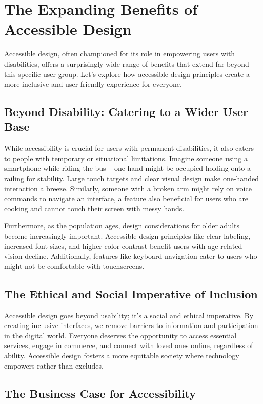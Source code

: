 \section{The Expanding Benefits of Accessible Design}

Accessible design, often championed for its role in empowering users with
disabilities, offers a surprisingly wide range of benefits that extend far
beyond this specific user group.  Let's explore how accessible design principles
create a more inclusive and user-friendly experience for everyone.

\subsection{Beyond Disability:  Catering to a Wider User Base}

While accessibility is crucial for users with permanent disabilities, it also
caters to people with temporary or situational limitations. Imagine someone
using a smartphone while riding the bus -- one hand might be occupied holding
onto a railing for stability. Large touch targets and clear visual design make
one-handed interaction a breeze. Similarly, someone with a broken arm might rely
on voice commands to navigate an interface, a feature also beneficial for users
who are cooking and cannot touch their screen with messy hands.

Furthermore, as the population ages, design considerations for older adults
become increasingly important.  Accessible design principles like clear
labeling, increased font sizes, and higher color contrast benefit users with
age-related vision decline. Additionally, features like keyboard navigation
cater to users who might not be comfortable with touchscreens.

\subsection{The Ethical and Social Imperative of Inclusion}

Accessible design goes beyond usability; it's a social and ethical imperative.
By creating inclusive interfaces, we remove barriers to information and
participation in the digital world.  Everyone deserves the opportunity to access
essential services, engage in commerce, and connect with loved ones online,
regardless of ability.  Accessible design fosters a more equitable society where
technology empowers rather than excludes.

\subsection{The Business Case for Accessibility}

